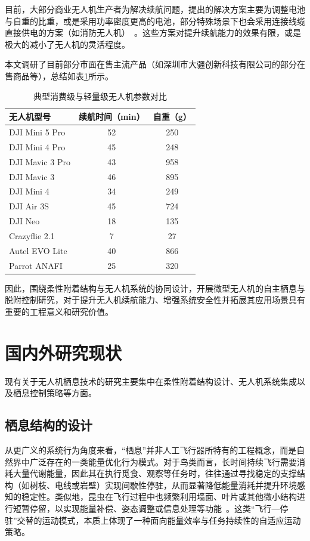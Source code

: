 目前，大部分商业无人机生产者为解决续航问题，提出的解决方案主要为调整电池与自重的比重，或是采用功率密度更高的电池，部分特殊场景下也会采用连接线缆直接供电的方案（如消防无人机）~\cite{mohsan2022towards}。这些方案对提升续航能力的效果有限，或是极大的减小了无人机的灵活程度。

本文调研了目前部分市面在售主流产品（如深圳市大疆创新科技有限公司的部分在售商品等），总结如表\ref{tab:drone_comparison}所示。

\begin{table}[htbp]
\centering
\caption{典型消费级与轻量级无人机参数对比}
\label{tab:drone_comparison}
\begin{tabular}{lcc}
\toprule
无人机型号 & 续航时间（min） & 自重（g） \\
\midrule
DJI Mini 5 Pro   & 52 & 250 \\
DJI Mini 4 Pro   & 45 & 248 \\
DJI Mavic 3 Pro  & 43 & 958 \\
DJI Mavic 3      & 46 & 895 \\
DJI Mini 4       & 34 & 249 \\
DJI Air 3S       & 45 & 724 \\
DJI Neo          & 18 & 135 \\
Crazyflie 2.1    & 7  & 27 \\
Autel EVO Lite   & 40 & 866 \\
Parrot ANAFI     & 25 & 320 \\
\bottomrule
\end{tabular}
\end{table}

因此，围绕柔性附着结构与无人机系统的协同设计，开展微型无人机的自主栖息与脱附控制研究，对于提升无人机续航能力、增强系统安全性并拓展其应用场景具有重要的工程意义和研究价值。

\section{国内外研究现状}
现有关于无人机栖息技术的研究主要集中在柔性附着结构设计、无人机系统集成以及栖息控制策略等方面。

\subsection{栖息结构的设计}
从更广义的系统行为角度来看，“栖息”并非人工飞行器所特有的工程概念，而是自然界中广泛存在的一类能量优化行为模式。对于鸟类而言，长时间持续飞行需要消耗大量代谢能量，因此其在执行觅食、观察等任务时，往往通过寻找稳定的支撑结构（如树枝、电线或岩壁）实现间歇性停驻，从而显著降低能量消耗并提升环境感知的稳定性。类似地，昆虫在飞行过程中也频繁利用墙面、叶片或其他微小结构进行短暂停留，以实现能量补偿、姿态调整或信息处理等功能~\cite{kovac2016learning,roderick2017touchdown}。这类“飞行—停驻”交替的运动模式，本质上体现了一种面向能量效率与任务持续性的自适应运动策略。

